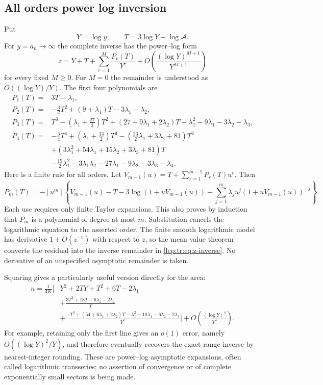 \documentclass[11pt]{article}
\numberwithin{equation}{section}
\theoremstyle{definition}\newtheorem{definition}[theorem]{Definition}
\theoremstyle{remark}\newtheorem{remark}[theorem]{Remark}
\begin{document}
\subsection{All orders power log inversion}
Put
\[
 Y=\log y,\qquad T=3\log Y-\log\mathcal A.
\]
For $y=a_n\to\infty$ the complete inverse has the power--log form
\begin{equation}\label{lcp:tr:eq:z-inverse}
 z=Y+T+\sum_{r=1}^{M}\frac{P_r(T)}{Y^r}
       +O\left(\frac{(\log Y)^{M+1}}{Y^{M+1}}\right)
\end{equation}
for every fixed $M\ge0$. For $M=0$ the remainder is understood as
$O((\log Y)/Y)$. The first four polynomials are
\begin{align*}
 P_1(T)={}&3T-\lambda_1,\\
 P_2(T)={}&-\frac32T^2+(9+\lambda_1)T-3\lambda_1-\lambda_2,\\
 P_3(T)={}&T^3-\left(\lambda_1+\frac{27}{2}\right)T^2
 +(27+9\lambda_1+2\lambda_2)T
 -\lambda_1^2-9\lambda_1-3\lambda_2-\lambda_3,\\
 P_4(T)={}&-\frac34T^4+\left(\lambda_1+\frac{33}{2}\right)T^3
 -\left(\frac{33}{2}\lambda_1+3\lambda_2+81\right)T^2\\
 &+(3\lambda_1^2+54\lambda_1+15\lambda_2+3\lambda_3+81)T\\
 &-\frac{15}{2}\lambda_1^2-3\lambda_1\lambda_2
 -27\lambda_1-9\lambda_2-3\lambda_3-\lambda_4.
\end{align*}
Here is a finite rule for all orders. Let
$V_{m-1}(u)=T+\sum_{r=1}^{m-1}P_r(T)u^r$. Then
\[
 P_m(T)=-[u^m]\left\{
 V_{m-1}(u)-T-3\log(1+uV_{m-1}(u))
 +\sum_{j=1}^{m}\lambda_j u^j(1+uV_{m-1}(u))^{-j}\right\}.
\]
Each use requires only finite Taylor expansions. This also proves by induction
that $P_m$ is a polynomial of degree at most $m$. Substitution cancels the
logarithmic equation to the asserted order. The finite smooth logarithmic model
has derivative $1+O(z^{-1})$ with respect to $z$, so the mean value theorem
converts the residual into the inverse remainder in \eqref{lcp:tr:eq:z-inverse}.
No derivative of an unspecified asymptotic remainder is taken.

Squaring gives a particularly useful version directly for the area:
\begin{align*}
 n=\frac1{4K}\Bigg[{}&Y^2+2TY+T^2+6T-2\lambda_1\\
 &+\frac{3T^2+18T-6\lambda_1-2\lambda_2}{Y}\\
 &+\frac{-T^3+(54+6\lambda_1+2\lambda_2)T
 -\lambda_1^2-18\lambda_1-6\lambda_2-2\lambda_3}{Y^2}\Bigg]
 +O\left(\frac{(\log Y)^4}{Y^3}\right).
\end{align*}
For example, retaining only the first line gives an $o(1)$ error, namely
$O((\log Y)^2/Y)$, and therefore eventually recovers the exact-range inverse
by nearest-integer rounding. These are power--log asymptotic expansions, often
called logarithmic transseries; no assertion of convergence or of complete
exponentially small sectors is being made.
\end{document}
